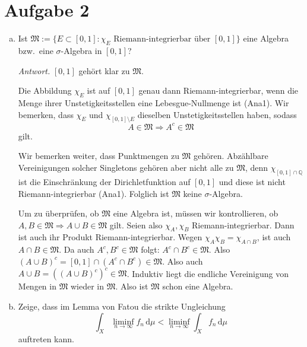 \documentclass[10pt]{article}\usepackage[]{graphicx}\usepackage[]{color}
\newcommand{\Q}{\mathbb{Q}}
\newcommand{\df}{\,\textrm{d}}
\begin{document}
\section*{Aufgabe 2}
\begin{enumerate}[(a)]
  \item Ist 
  $\mathfrak{M} := \{E \subset [0,1] : \textrm{$\chi_E$ Riemann-integrierbar über $[0,1]$}\}$
  eine Algebra bzw.\ eine $\sigma$-Algebra in $[0,1]$?
  
  \textit{Antwort.}
  $[0,1]$ gehört klar zu $\mathfrak{M}$.
  
  Die Abbildung $\chi_E$ ist auf $[0,1]$ genau dann Riemann-integrierbar,
  wenn die Menge ihrer Unstetigkeitsstellen eine Lebesgue-Null\-menge ist (Ana1).
  Wir bemerken, dass $\chi_E$ und $\chi_{[0,1] \setminus E}$ dieselben
  Unstetigkeitsstellen haben, sodass
  \[
    A \in \mathfrak{M} \Rightarrow A^c \in \mathfrak{M}
  \]
  gilt.
  
  Wir bemerken weiter, dass Punktmengen zu $\mathfrak{M}$ gehören.
  Abzählbare Vereinigungen solcher Singletons gehören aber nicht
  alle zu $\mathfrak{M}$, denn $\chi_{[0,1] \cap \Q}$ ist 
  die Einschränkung der Dirichletfunktion auf $[0,1]$ und diese 
  ist nicht Riemann-integrierbar (Ana1). 
  Folglich ist $\mathfrak{M}$ keine $\sigma$-Algebra.
  
  Um zu überprüfen, ob $\mathfrak{M}$ eine Algebra ist,
  müssen wir kontrollieren, ob 
  $A, B \in \mathfrak{M} \Rightarrow A \cup B \in \mathfrak{M}$
  gilt.
  Seien also $\chi_A, \chi_B$ Riemann-integrierbar.
  Dann ist auch ihr Produkt Riemann-integrierbar.
  Wegen $\chi_A\chi_B = \chi_{A \cap B}$,
  ist auch $A \cap B \in \mathfrak{M}$.
  Da auch $A^c, B^c \in \mathfrak{M}$ folgt:
  $A^c \cap B^c \in \mathfrak{M}$.
  Also $(A \cup B)^c = [0,1] \cap (A^c \cap B^c) \in \mathfrak{M}$.
  Also auch $A \cup B = ((A \cup B)^c)^c \in \mathfrak{M}$.
  Induktiv liegt die endliche Vereinigung von Mengen in $\mathfrak{M}$
  wieder in $\mathfrak{M}$.
  Also ist $\mathfrak{M}$ schon eine Algebra.

  \item Zeige, dass im Lemma von Fatou die strikte 
  Ungleichung
  \[
    \int_X \liminf_{n \to \infty} f_n \df \mu < \liminf_{n \to \infty}\int_X f_n \df \mu
  \]
  auftreten kann.
  

\end{enumerate}
\end{document}
